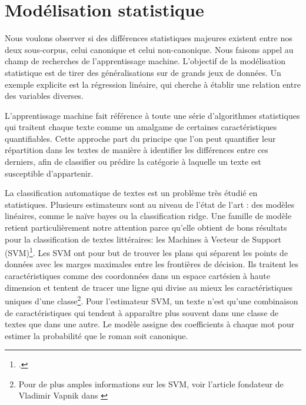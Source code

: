 \section{Modélisation statistique}

Nous voulons observer si des différences statistiques majeures existent entre nos deux sous-corpus, celui canonique et celui non-canonique. Nous faisons appel au champ de recherches de l'apprentissage machine. L'objectif de la modélisation statistique est de tirer des généralisations sur de grands jeux de données. Un exemple explicite est la régression linéaire, qui cherche à établir une relation entre des variables diverses. 

L'apprentissage machine fait référence à toute une série d'algorithmes statistiques qui traitent chaque texte comme un amalgame de certaines caractéristiques quantifiables. Cette approche part du principe que l'on peut quantifier leur répartition dans les textes de manière à identifier les différences entre ces derniers, afin de classifier ou prédire la catégorie à laquelle un texte est susceptible d'appartenir. 


La classification automatique de textes est un problème très étudié en statistiques. Plusieurs estimateurs sont au niveau de l'état de l'art : des modèles linéaires, comme le naïve bayes ou la classification ridge. Une famille de modèle retient particulièrement notre attention parce qu'elle obtient de bons résultats pour la classification de textes littéraires: les Machines à Vecteur de Support (SVM)\footcites{yu_evaluation_2008}. Les SVM ont pour but de trouver les plans qui séparent les points de données avec les marges maximales entre les frontières de décision. Ils traitent les caractéristiques comme des coordonnées dans un espace cartésien à haute dimension et tentent de tracer une ligne qui divise au mieux les caractéristiques uniques d'une classe\footnote{Pour de plus amples informations sur les SVM, voir l'article fondateur de Vladimir Vapnik dans \cites{cortes_support-vector_1995}}. Pour l'estimateur SVM, un texte n'est qu'une combinaison de caractéristiques qui tendent à apparaître plus souvent dans une classe de textes que dans une autre. Le modèle assigne des coefficients à chaque mot pour estimer la probabilité que le roman soit canonique. 

